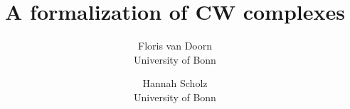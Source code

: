 \documentclass{article}
\title{A formalization of CW complexes}
\author{Floris van Doorn \\University of Bonn \and Hannah Scholz\\ University of Bonn}
\theoremstyle{definition}
\theoremstyle{plain}
\begin{document}
\maketitle
\tableofcontents        %

\clearpage
















\clearpage
\nocite{*}              %
\printbibliography      %
\end{document}
